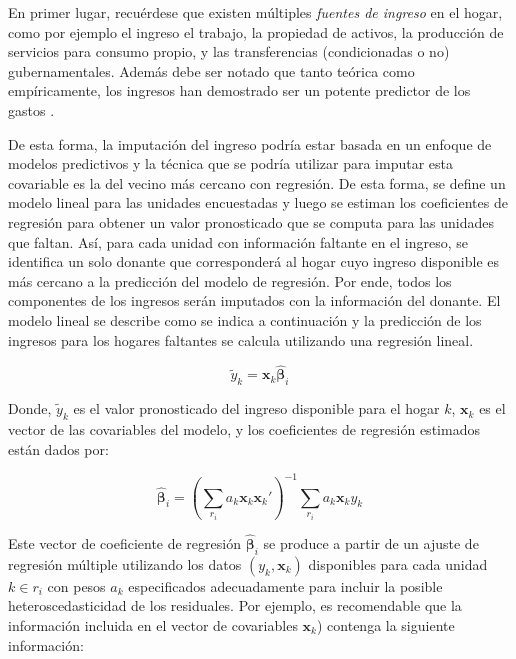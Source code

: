 \documentclass[
  12pt,
  spanish,
]{book}
\begin{document}
En primer lugar, recuérdese que existen múltiples \emph{fuentes de ingreso} en el hogar, como por ejemplo el ingreso el trabajo, la propiedad de activos, la producción de servicios para consumo propio, y las transferencias (condicionadas o no) gubernamentales. Además debe ser notado que tanto teórica como empíricamente, los ingresos han demostrado ser un potente predictor de los gastos \citep{Starick_Watson_2011}.

De esta forma, la imputación del ingreso podría estar basada en un enfoque de modelos predictivos y la técnica que se podría utilizar para imputar esta covariable es la del vecino más cercano con regresión. De esta forma, se define un modelo lineal para las unidades encuestadas y luego se estiman los coeficientes de regresión para obtener un valor pronosticado que se computa para las unidades que faltan. Así, para cada unidad con información faltante en el ingreso, se identifica un solo donante que corresponderá al hogar cuyo ingreso disponible es más cercano a la predicción del modelo de regresión. Por ende, todos los componentes de los ingresos serán imputados con la información del donante. El modelo lineal se describe como se indica a continuación y la predicción de los ingresos para los hogares faltantes se calcula utilizando una regresión lineal.

\[\tilde{y}_k = \mathbf{x}_k \hat{\boldsymbol{\beta}}_i\]

Donde, \(\tilde{y}_k\) es el valor pronosticado del ingreso disponible para el hogar \(k\), \(\mathbf{x}_k\) es el vector de las covariables del modelo, y los coeficientes de regresión estimados están dados por:

\[
\hat{\boldsymbol{\beta}}_i = \left(\sum_{r_i} a_k\mathbf{x}_k\mathbf{x}_k'\right)^{-1}
\sum_{r_i} a_k\mathbf{x}_ky_k
\]

Este vector de coeficiente de regresión \(\hat{\boldsymbol{\beta}}_i\) se produce a partir de un ajuste de regresión múltiple utilizando los datos \((y_k, \mathbf{x}_k)\) disponibles para cada unidad \(k \in r_i\) con pesos \(a_k\) especificados adecuadamente para incluir la posible heteroscedasticidad de los residuales. Por ejemplo, es recomendable que la información incluida en el vector de covariables \(\mathbf{x}_k\)) contenga la siguiente información:
\end{document}
